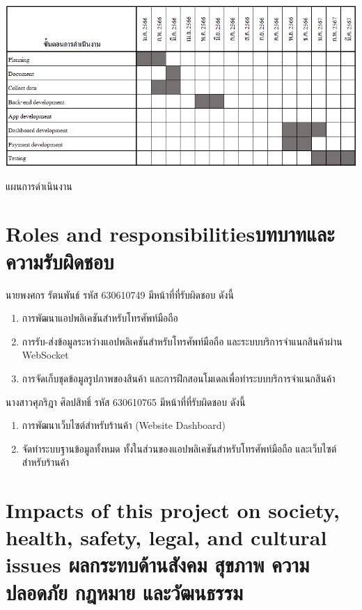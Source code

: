 \begin{table}[h]
    \begin{center}

        \vspace{0.5cm}\includegraphics[scale=0.64]{pic/plane.png}
    \end{center}

    \caption[แผนการดำเนินงาน]{แผนการดำเนินงาน}
    \label{table:Planning}
\end{table}

\newpage
\section{\ifenglish Roles and responsibilities\else บทบาทและความรับผิดชอบ\fi}

\par นายพงศกร รัตนพันธ์ รหัส 630610749 มีหน้าที่ที่รับผิดชอบ ดังนี้
\begin{enumerate}
    \item การพัฒนาแอปพลิเคชันสำหรับโทรศัพท์มือถือ
    \item การรับ-ส่งข้อมูลระหว่างแอปพลิเคชันสำหรับโทรศัพท์มือถือ และระบบบริการจำแนกสินค้าผ่าน WebSocket
    \item การจัดเก็บชุดข้อมูลรูปภาพของสินค้า และการฝึกสอนโมเดลเพื่อทำระบบบริการจำแนกสินค้า
\end{enumerate}นางสาวศุภริฎา  ศิลปสิทธิ์ รหัส 630610765 มีหน้าที่ที่รับผิดชอบ ดังนี้
\begin{enumerate}
    \item การพัฒนาเว็บไซต์สำหรับร้านค้า (Website Dashboard)
    \item จัดทำระบบฐานข้อมูลทั้งหมด ทั้งในส่วนของแอปพลิเคชันสำหรับโทรศัพท์มือถือ และเว็บไซต์สำหรับร้านค้า
\end{enumerate}

\section{\ifenglish%
      Impacts of this project on society, health, safety, legal, and cultural issues
  \else%
      ผลกระทบด้านสังคม สุขภาพ ความปลอดภัย กฎหมาย และวัฒนธรรม
  \fi}

